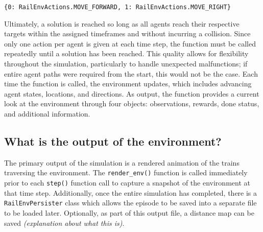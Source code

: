 \begin{verbatim}
{0: RailEnvActions.MOVE_FORWARD, 1: RailEnvActions.MOVE_RIGHT}
\end{verbatim}

\noindent Ultimately, a solution is reached so long as all agents reach their respective targets within the assigned timeframes and without incurring a collision.  
Since only one action per agent is given at each time step, the function must be called repeatedly until a solution has been reached.  
This quality allows for flexibility throughout the simulation, particularly to handle unexpected malfunctions; if entire agent paths were required from the start, this would not be the case.  
Each time the function is called, the environment updates, which includes advancing agent states, locations, and directions. 
As output, the function provides a current look at the environment through four objects: observations, rewards, done status, and additional information.

\subsection{What is the output of the environment?}
The primary output of the simulation is a rendered animation of the trains traversing the environment.  
The \texttt{render\_env()} function is called immediately prior to each \texttt{step()} function call to capture a snapshot of the environment at that time step.  
Additionally, once the entire simulation has completed, there is a \texttt{RailEnvPersister} class which allows the episode to be saved into a separate file to be loaded later.  
Optionally, as part of this output file, a distance map can be saved \textit{(explanation about what this is)}.

